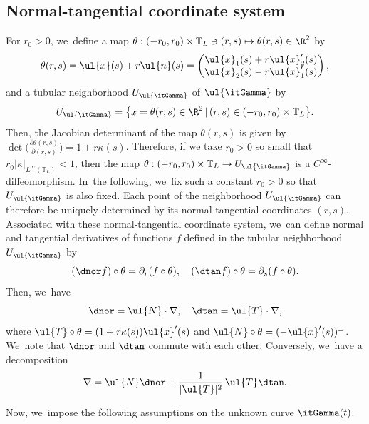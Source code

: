 \subsection{Normal-tangential coordinate system}\label{subsect:NTCS}
For $r_0>0$, we~define a map $\theta: (-r_0,r_0)\times\mathbb{T}_L\ni(r,s) \mapsto \theta(r,s)\in\R^2$ by
\begin{equation}\label{diffeo-theta}
\theta(r,s) = \ul{x}(s) + r\ul{n}(s) =
\begin{pmatrix}
\ul{x}_1(s) + r\ul{x}_2'(s) \\
\ul{x}_2(s) - r\ul{x}_1'(s)
\end{pmatrix},
\end{equation}
and a tubular neighborhood $U_{\ul{\itGamma}}$ of $\ul{\itGamma}$ by
\[
U_{\ul{\itGamma}} = \bigl\{ x=\theta(r,s)\in\R^2 \,|\, (r,s)\in (-r_0,r_0)\times\mathbb{T}_L \bigr\}.
\]
Then, the Jacobian determinant of the map $\theta(r,s)$ is given by $\det\bigl(\frac{\partial\theta(r,s)}{\partial(r,s)} \bigr) = 1+r\kappa(s)$.
Therefore, if we take $r_0>0$ so small that $r_0 |\kappa|_{L^\infty(\mathbb{T}_L)}<1$,
then the map \hbox{$\theta: (-r_0,r_0)\times\mathbb{T}_L \to U_{\ul{\itGamma}}$} is a $C^\infty$-diffeomorphism. In~the following, we~fix such a constant $r_0>0$ so that $U_{\ul{\itGamma}}$ is also fixed.
Each point of the neighborhood $U_{\ul{\itGamma}}$ can therefore be uniquely determined by its normal-tangential coordinates $(r, s)$.
Associated with these normal-tangential coordinate system, we~can define normal and tangential derivatives of functions $f$ defined in the tubular neighborhood $U_{\ul{\itGamma}}$ by
\begin{equation}\label{NorTanD}
(\dnor f)\circ\theta = \partial_r(f\circ\theta), \quad
(\dtan f)\circ\theta = \partial_s(f\circ\theta).
\end{equation}
Then, we~have
\begin{equation}\label{NorTanD2}
\dnor = \ul{N}\cdot\nabla,\quad
\dtan = \ul{T}\cdot\nabla,
\end{equation}
where $\ul{T}\circ\theta = (1+r\kappa(s))\ul{x}'(s)$ and $\ul{N}\circ\theta = (-\ul{x}'(s))^\perp$. We~note that $\dnor$ and $\dtan$ commute with each other.
Conversely, we~have a decomposition
\begin{equation}\label{diff deco}
\nabla = \ul{N}\dnor + \frac{1}{|\ul{T}|^2}\,{\ul{T}}\dtan.
\end{equation}

Now, we~impose the following assumptions on the unknown curve $\itGamma(t)$.

